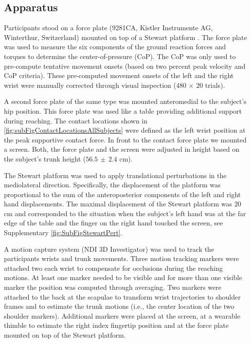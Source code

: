 \subsection{Apparatus}

Participants stood on a force plate (9281CA, Kistler Instrumente AG, Winterthur,
Switzerland) mounted on top of a Stewart platform \cite{stewart1965platform}.
The force plate was used to measure the six components of the ground reaction
forces and torques to determine the center-of-pressure (CoP). The CoP was only used 
to pre-compute tentative movement onsets (based on two percent peak velocity and CoP criteria).
These pre-computed movement onsets of the left and the right wrist were manually corrected through visual inspection ($480\,\times\,20$ trials). 

A second force plate of the same type was mounted anteromedial to the subject's hip
position. This force plate was used like a table providing additional support 
during reaching. The contact locations shown in \FigureAbbr \ref{fig:subFigContactLocationsAllSubjects} were
defined as the left wrist position at the peak supportive contact force. In front to the 
contact force plate we mounted a screen. Both, the force plate and the screen
were adjusted in height based on the subject's trunk height ($56.5 \, \pm \, 2.4$ cm).

The Stewart platform was used to apply translational perturbations in the 
mediolateral direction. Specifically, the displacement of the platform was 
proportional to the sum of the anteroposterior components of the left and right 
hand displacements. The maximal displacement of the Stewart platform was $20$ cm 
and corresponded to the situation when the subject's left hand was at the far 
edge of the table and the finger on the right hand touched the screen, see 
Supplementary \FigureAbbr \ref{fig:SubFigStewartPert}.

A motion capture system (NDI 3D Investigator) was used to track the participants 
wrists and trunk movements. Three motion tracking markers were attached two each wrist to 
compensate for occlusions during the reaching motions. At least one marker 
needed to be visible and for more than one visible marker the position was 
computed through averaging. Two markers were attached to the back at the 
scapulae to transform wrist trajectories to shoulder frames and to estimate the 
trunk motions (i.e., the center location of the two shoulder markers). 
Additional markers were placed at the screen, at a wearable thimble to estimate 
the right index fingertip position and at the force plate mounted on top of the 
Stewart platform.


